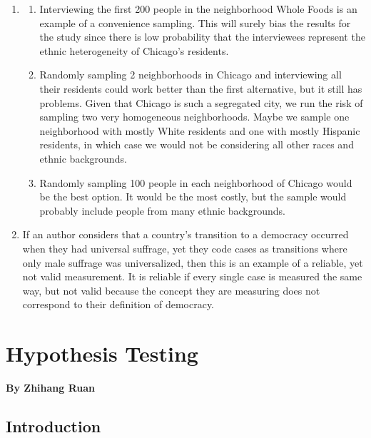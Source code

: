 \documentclass{book}
\begin{document}
\begin{enumerate}
\item
  \begin{enumerate}
  \def\labelenumii{\arabic{enumii}.}
  \item
    Interviewing the first 200 people in the neighborhood Whole Foods is an
    example of a convenience sampling. This will surely bias the results for
    the study since there is low probability that the interviewees represent
    the ethnic heterogeneity of Chicago's residents.
  \item
    Randomly sampling 2 neighborhoods in Chicago and interviewing all their
    residents could work better than the first alternative, but it still has
    problems. Given that Chicago is such a segregated city, we run the risk of
    sampling two very homogeneous neighborhoods. Maybe we sample one
    neighborhood with mostly White residents and one with mostly Hispanic
    residents, in which case we would not be considering all other races and
    ethnic backgrounds.
  \item
    Randomly sampling 100 people in each neighborhood of Chicago would be the
    best option. It would be the most costly, but the sample would probably
    include people from many ethnic backgrounds.
  \end{enumerate}
\item
  If an author considers that a country's transition to a democracy occurred
  when they had universal suffrage, yet they code cases as transitions where
  only male suffrage was universalized, then this is an example of a reliable,
  yet not valid measurement. It is reliable if every single case is measured
  the same way, but not valid because the concept they are measuring does not
  correspond to their definition of democracy.
\end{enumerate}

\hypertarget{hypothesis-testing}{%
\chapter{Hypothesis Testing}\label{hypothesis-testing}}

\textbf{By Zhihang Ruan}

\hypertarget{introduction-4}{%
\section{Introduction}\label{introduction-4}}
\end{document}
